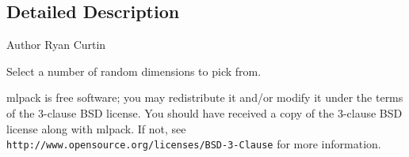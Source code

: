 \subsection{Detailed Description}
\begin{DoxyAuthor}{Author}
Ryan Curtin
\end{DoxyAuthor}
Select a number of random dimensions to pick from.

mlpack is free software; you may redistribute it and/or modify it under the terms of the 3-\/clause B\+SD license. You should have received a copy of the 3-\/clause B\+SD license along with mlpack. If not, see {\tt http\+://www.\+opensource.\+org/licenses/\+B\+S\+D-\/3-\/\+Clause} for more information. 